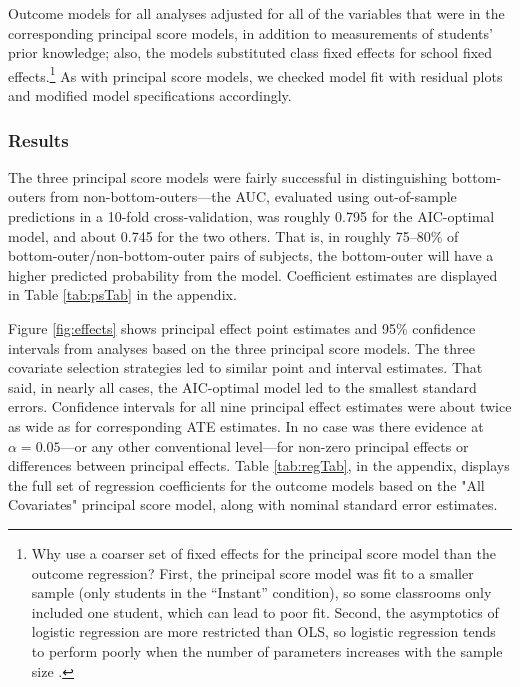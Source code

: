\documentclass[]{article}
\begin{document}
Outcome models for all analyses adjusted for all of the variables that were in the corresponding principal score models, in addition to measurements of students' prior knowledge; also, the models substituted class fixed effects for school fixed effects.\footnote{Why use a coarser set of fixed effects for the principal score model than the outcome regression? First, the principal score model was fit to a smaller sample (only students in the ``Instant'' condition), so some classrooms only included one student, which can lead to poor fit. Second, the asymptotics of logistic regression are more restricted than OLS, so logistic regression tends to perform poorly when the number of parameters increases with the sample size \citep{agresti}.}
As with principal score models, we checked model fit with residual plots and modified model specifications accordingly.



\subsubsection{Results}

The three principal score models were fairly successful in distinguishing bottom-outers from non-bottom-outers---the AUC, evaluated using out-of-sample predictions in a 10-fold cross-validation, was roughly 0.795 for the AIC-optimal model, and about 0.745 for the two others. That is, in roughly 75--80\% of bottom-outer/non-bottom-outer pairs of subjects, the bottom-outer will have a higher predicted probability from the model.
Coefficient estimates are displayed in Table \ref{tab:psTab} in the appendix.

Figure \ref{fig:effects} shows principal effect point estimates and 95\% confidence intervals from analyses based on the three principal score models.
The three covariate selection strategies led to similar point and interval estimates.
That said, in nearly all cases, the AIC-optimal model led to the smallest standard errors.
Confidence intervals for all nine principal effect estimates were about twice as wide as for corresponding ATE estimates.
In no case was there evidence at $\alpha=0.05$---or any other conventional level---for non-zero principal effects or differences between principal effects.
Table \ref{tab:regTab}, in the appendix, displays the full set of regression coefficients for the outcome models based on the "All Covariates" principal score model, along with nominal standard error estimates.
\end{document}
